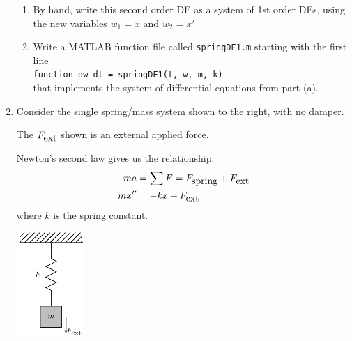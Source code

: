 \begin{enumerate}
\begin{Question}
\begin{enumerate}
\item By hand, write this second order DE as a system of 1st order
  DEs, using the new variables $w_1 = x$ and $w_2 = x'$

\item Write a MATLAB function file called \verb#springDE1.m# starting
  with the first line \\
\verb#function dw_dt = springDE1(t, w, m, k)# \\
  that implements the system of differential equations from part (a).
\end{enumerate}
\end{Question}

\begin{Solution}
\end{Solution}



\item  \label{SpringNoDampingWithFext}
  \begin{Question}
    \begin{minipage}[t]{0.6\linewidth}
\vspace{0pt}
Consider the single spring/mass system shown to the right, with no damper.

The $F_{\mbox{ext}}$ shown is an external applied force.

Newton's second law gives us the relationship:
\begin{align*}
ma & = \sum F = F_{\mbox{spring}} + F_{\mbox{ext}} \\
m x'' & = -k x + F_{\mbox{ext}} 
\end{align*}
where $k$ is the spring constant.
    \end{minipage}
    \begin{minipage}[t]{0.3\linewidth}
\vspace{0pt}
\begin{center}
\includegraphics[width=1.0in]{graphics/Week08_Spring/SpringNoDampingWithFext}
\end{center}
    \end{minipage}



\end{Question}
\end{enumerate}
